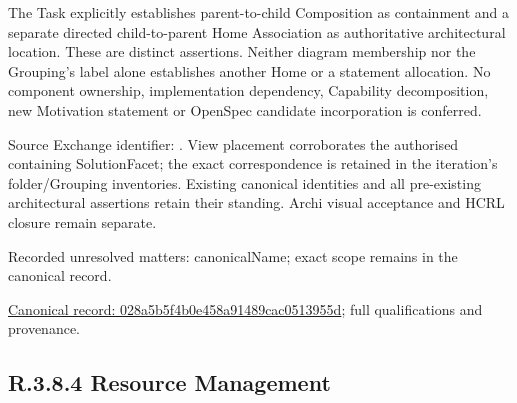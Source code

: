 The Task explicitly establishes parent-to-child Composition as containment and
a separate directed child-to-parent Home Association as authoritative architectural
location. These are distinct assertions. Neither diagram membership nor the
Grouping's label alone establishes another Home or a statement allocation.
No component ownership, implementation dependency, Capability decomposition,
new Motivation statement or OpenSpec candidate incorporation is conferred.



Source Exchange identifier: \texttt{}. View placement corroborates
the authorised containing SolutionFacet; the exact correspondence is retained in the
iteration's folder/Grouping inventories. Existing canonical identities and all
pre-existing architectural assertions retain their standing. Archi visual
acceptance and HCRL closure remain separate.


{\small Recorded unresolved matters: canonicalName; exact scope remains in the canonical record.}\par
{\footnotesize \href{../../../../../../../continuum/grouping/028a5b5f4b0e458a91489cac0513955d.md}{Canonical record: 028a5b5f4b0e458a91489cac0513955d}; full qualifications and provenance.}\par
\subsection*{R.3.8.4 Resource Management}
\label{navigation:R.3.8.4}


